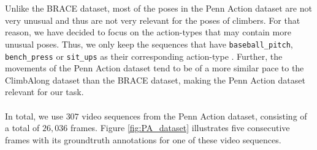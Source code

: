 \documentclass[./main.tex]{subfiles}
\begin{document}
\\
\\
Unlike the BRACE dataset, most of the poses in the Penn Action dataset are not very unusual and thus are not very relevant for the poses of climbers. For that reason, we have decided to focus on the action-types that may contain more unusual poses. Thus, we only keep the sequences that have \texttt{baseball\_pitch}, \texttt{bench\_press} or \texttt{sit\_ups} as their corresponding action-type \cite{penn_action}. Further, the movements of the Penn Action dataset tend to be of a more similar pace to the ClimbAlong dataset than the BRACE dataset, making the Penn Action dataset relevant for our task.
\\
\\
In total, we use $307$ video sequences from the Penn Action dataset, consisting of a total of $26,036$ frames. Figure \ref{fig:PA_dataset} illustrates five consecutive frames with its groundtruth annotations for one of these video sequences.
\end{document}
